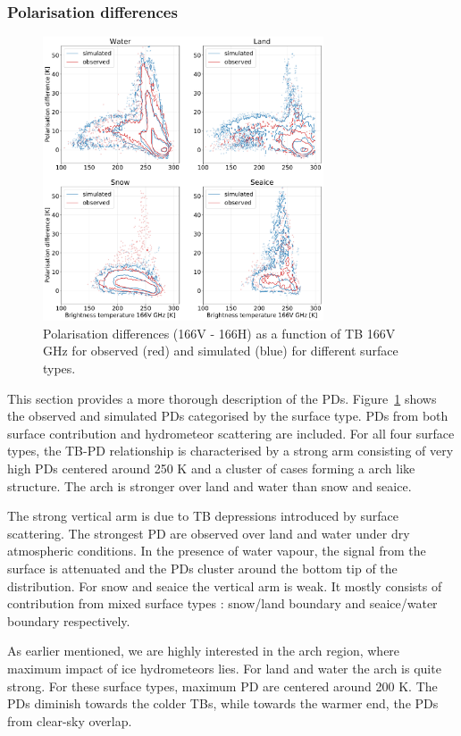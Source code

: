 \documentclass[amt, manuscript]{copernicus}
\begin{document}
\subsubsection{Polarisation differences}
\label{sec:PD}

\begin{figure}[t]
	\includegraphics[width=8.3cm]{Figures/hist2d_all_surface_jan.pdf}
	\caption{Polarisation differences (166V - 166H) as a function of
		TB 166V GHz for observed (red) and simulated (blue) for
		different surface types.}
	\label{fig:PD}
\end{figure}

This section provides a more thorough description of the PDs.  Figure~\ref{fig:PD} shows the observed and simulated PDs categorised by the surface type. PDs from both surface contribution and hydrometeor scattering are included. For all four surface types, the TB-PD relationship is characterised by a strong arm consisting of very high PDs centered around 250\,\,K and a cluster of cases forming a arch like structure. The arch is stronger over land and water than snow and seaice. 

The strong vertical arm is due to TB depressions introduced by surface scattering. The strongest PD are observed over land and water under dry atmospheric conditions. In the presence of water vapour, the signal from the surface is attenuated and the PDs cluster around the bottom tip of the distribution. For snow and seaice the vertical arm is weak. It mostly consists of contribution from mixed surface types : snow/land boundary and seaice/water boundary respectively. 

As earlier mentioned, we are highly interested in the arch region, where maximum impact of ice hydrometeors lies. For land and water the arch is quite strong. For these surface types, maximum PD are centered around 200\,\,K. The PDs diminish towards the colder TBs, while towards the warmer end, the PDs from clear-sky overlap. 
\end{document}
